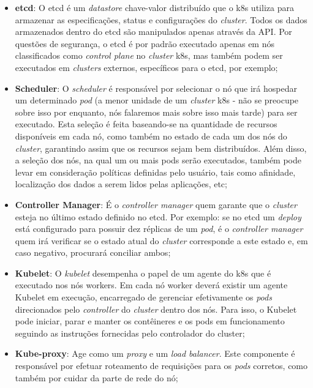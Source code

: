 \documentclass[12pt,a4paper]{article}
\begin{document}
\begin{itemize}
    \item \textbf{etcd}: O etcd é um \textit{datastore} chave-valor distribuído que o k8s utiliza para armazenar as especificações, status e configurações do \textit{cluster}. Todos os dados armazenados dentro do etcd são manipulados apenas através da API. Por questões de segurança, o etcd é por padrão executado apenas em nós classificados como \textit{control plane} no \textit{cluster} k8s, mas também podem ser executados em \textit{clusters} externos, específicos para o etcd, por exemplo;
    \item \textbf{Scheduler}: O \textit{scheduler} é responsável por selecionar o nó que irá hospedar um determinado \textit{pod} (a menor unidade de um \textit{cluster} k8s - não se preocupe sobre isso por enquanto, nós falaremos mais sobre isso mais tarde) para ser executado. Esta seleção é feita baseando-se na quantidade de recursos disponíveis em cada nó, como também no estado de cada um dos nós do \textit{cluster}, garantindo assim que os recursos sejam bem distribuídos. Além disso, a seleção dos nós, na qual um ou mais pods serão executados, também pode levar em consideração políticas definidas pelo usuário, tais como afinidade, localização dos dados a serem lidos pelas aplicações, etc;
    \item \textbf{Controller Manager}: É o \textit{controller manager} quem garante que o \textit{cluster} esteja no último estado definido no etcd. Por exemplo: se no etcd um \textit{deploy} está configurado para possuir dez réplicas de um \textit{pod}, é o \textit{controller manager} quem irá verificar se o estado atual do \textit{cluster} corresponde a este estado e, em caso negativo, procurará conciliar ambos;
    \item \textbf{Kubelet}: O \textit{kubelet} desempenha o papel de um agente do k8s que é executado nos nós workers. Em cada nó worker deverá existir um agente Kubelet em execução, encarregado de gerenciar efetivamente os \textit{pods} direcionados pelo \textit{controller} do \textit{cluster} dentro dos nós. Para isso, o Kubelet pode iniciar, parar e manter os contêineres e os pods em funcionamento seguindo as instruções fornecidas pelo controlador do cluster;
    \item \textbf{Kube-proxy}: Age como um \textit{proxy} e um \textit{load balancer}. Este componente é responsável por efetuar roteamento de requisições para os \textit{pods} corretos, como também por cuidar da parte de rede do nó;
\end{itemize}
\end{document}
